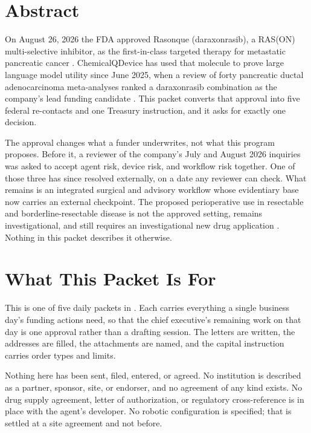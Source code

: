 \section*{Abstract}

On August 26, 2026 the FDA approved Rasonque (daraxonrasib), a RAS(ON)
multi-selective inhibitor, as the first-in-class targeted therapy for metastatic
pancreatic cancer \cite{fdarasonque2026}. ChemicalQDevice has used that molecule
to prove large language model utility since June 2025, when a review of forty
pancreatic ductal adenocarcinoma meta-analyses ranked a daraxonrasib combination
as the company's lead funding candidate \cite{daraxident}. This packet converts
that approval into five federal re-contacts and one Treasury instruction, and it
asks for exactly one decision.

The approval changes what a funder underwrites, not what this program proposes.
Before it, a reviewer of the company's July and August 2026 inquiries was asked
to accept agent risk, device risk, and workflow risk together. One of those three
has since resolved externally, on a date any reviewer can check. What remains is
an integrated surgical and advisory workflow whose evidentiary base now carries
an external checkpoint. The proposed perioperative use in resectable and
borderline-resectable disease is not the approved setting, remains
investigational, and still requires an investigational new drug application
\cite{ecfr2026part312}. Nothing in this packet describes it otherwise.

\section{What This Packet Is For}

This is one of five daily packets in
. Each carries everything a single business day's
funding actions need, so that the chief executive's remaining work on that day is
one approval rather than a drafting session. The letters are written, the
addresses are filled, the attachments are named, and the capital instruction
carries order types and limits.

Nothing here has been sent, filed, entered, or agreed. No institution is
described as a partner, sponsor, site, or endorser, and no agreement of any kind
exists. No drug supply agreement, letter of authorization, or regulatory
cross-reference is in place with the agent's developer. No robotic configuration
is specified; that is settled at a site agreement and not before.

